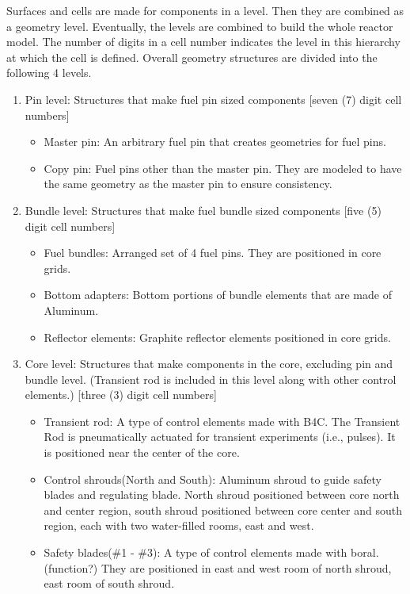 \documentclass{UWNR_modeling}
\begin{document}
Surfaces and cells are made for components in a level. Then they are combined as a geometry level. Eventually, the levels are combined to build the whole reactor model.  The number of digits in a cell number indicates the level in this hierarchy at which the cell is defined.  Overall geometry structures are divided into the following 4 levels.
\begin{enumerate}
\item Pin level: Structures that make fuel pin sized components [seven (7) digit cell numbers]
	\begin{itemize}
	\item Master pin: An arbitrary fuel pin that creates geometries for fuel pins.
	\item Copy pin: Fuel pins other than the master pin. They are modeled to have the same geometry as the master pin to ensure consistency.
	\end{itemize}
\item Bundle level: Structures that make fuel bundle sized components [five (5) digit cell numbers]
	\begin{itemize}
	\item Fuel bundles: Arranged set of 4 fuel pins. They are positioned in core grids.
	\item Bottom adapters: Bottom portions of bundle elements that are made of Aluminum.
	\item Reflector elements: Graphite reflector elements positioned in core grids.
	\end{itemize}
\item Core level: Structures that make components in the core, excluding pin and bundle level. (Transient rod is included in this level along with other control elements.) [three (3) digit cell numbers]
	\begin{itemize}
	\item Transient rod: A type of control elements made with B4C. The Transient Rod is pneumatically actuated for transient experiments (i.e., pulses). It is positioned near the center of the core.
	\item Control shrouds(North and South): Aluminum shroud to guide safety blades and regulating blade. North shroud positioned between core north and center region, south shroud positioned between core center and south region, each with two water-filled rooms, east and west.
	\item Safety blades(\#1 - \#3): A type of control elements made with boral. (function?) They are positioned in east and west room of north shroud, east room of south shroud.

\end{itemize}
\end{enumerate}
\end{document}
